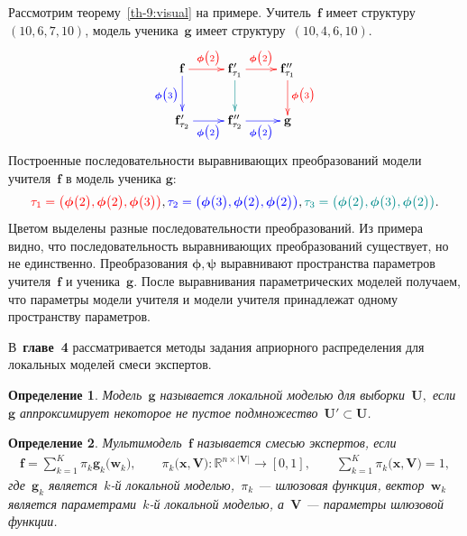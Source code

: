 \documentclass{dissert}
\newtheorem{definition}{Определение}
\begin{document}
Рассмотрим теорему~\ref{th-9:visual} на примере. Учитель~$\mathbf{f}$ имеет структуру~$(10, 6, 7, 10)$, модель ученика~$\mathbf{g}$ имеет структуру~$(10,4,6,10)$.
\[
\xymatrix{
\mathbf{f}\ar@[blue][d]_{\color{blue}\bm{\phi}\bigr(3\bigr)}\ar@[red][r]^{\color{red}\bm{\phi}\bigr(2\bigr)}
& 
\mathbf{f}_{\tau_1}'\ar@[darkcyan][d]\ar@[red][r]^{\color{red}\bm{\phi}\bigr(2\bigr)}
&
\mathbf{f}_{\tau_1}''\ar@[red][d]^{\color{red}\bm{\phi}\bigr(3\bigr)}
\\
\mathbf{f}_{\tau_2}'\ar@[blue][r]_{\color{blue}\bm{\phi}\bigr(2\bigr)}
& 
\mathbf{f}_{\tau_2}''\ar@[blue][r]_{\color{blue}\bm{\phi}\bigr(2\bigr)}
&
\mathbf{g}
}
\]
Построенные последовательности выравнивающих преобразований модели учителя~$\mathbf{f}$ в модель ученика $\mathbf{g}$:
\[
{\color{red}\tau_1=\left(\bm{\phi}\bigr(2\bigr), \bm{\phi}\bigr(2\bigr), \bm{\phi}\bigr(3\bigr)\right)}, {\color{blue}\tau_2=\left(\bm{\phi}\bigr(3\bigr), \bm{\phi}\bigr(2\bigr), \bm{\phi}\bigr(2\bigr)\right)}, {\color{darkcyan}\tau_3=\left(\bm{\phi}\bigr(2\bigr), \bm{\phi}\bigr(3\bigr), \bm{\phi}\bigr(2\bigr)\right)}.
\]
Цветом выделены разные последовательности преобразований.
Из примера видно, что последовательность выравнивающих преобразований существует, но не единственно. Преобразования $\bm{\phi}, \bm{\psi}$ выравнивают пространства параметров учителя~$\mathbf{f}$ и ученика~$\mathbf{g}$. После выравнивания параметрических моделей получаем, что параметры модели учителя и модели учителя принадлежат одному пространству параметров.

В~\textbf{главе~4} рассматривается методы задания априорного распределения для локальных моделей смеси экспертов.

\begin{definition}
\label{def:1}
Модель~$\mathbf{g}$ называется локальной моделью для выборки~$\textbf{U},$ если~$\mathbf{g}$ аппроксимирует некоторое не пустое подмножество~$\textbf{U}'\subset\textbf{U}$.
\end{definition}

\begin{definition}
\label{def:2}
Мультимодель~$\mathbf{f}$ называется смесью экспертов, если
\[
\label{ch4-eq:st:2}
\begin{aligned}
\mathbf{f} = \sum_{k=1}^{K}\pi_{k}\mathbf{g}_k\bigr(\mathbf{w}_k\bigr), \qquad \pi_{k}\bigr(\mathbf{x}, \mathbf{V}\bigr):\mathbb{R}^{n\times \left|\mathbf{V}\right|} \to [0, 1], \qquad \sum_{k=1}^{K}\pi_{k}\bigr(\mathbf{x}, \mathbf{V}\bigr) = 1,
\end{aligned}
\]
где~$\mathbf{g}_k$ является~$k$-й локальной моделью,~$\pi_k$ --- шлюзовая функция, вектор~$\mathbf{w}_k$ является параметрами~$k$-й локальной моделью, а~$\mathbf{V}$ --- параметры шлюзовой функции.
\end{definition}
\end{document}
